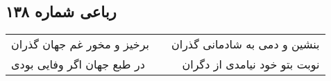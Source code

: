 \begin{center}
\section*{رباعی شماره ۱۳۸}
\label{sec:sh138}
\begin{longtable}{l p{0.5cm} r}
برخیز و مخور غم جهان گذران
&&
بنشین و دمی به شادمانی گذران
\\
در طبع جهان اگر وفایی بودی
&&
نوبت بتو خود نیامدی از دگران
\\
\end{longtable}
\end{center}
